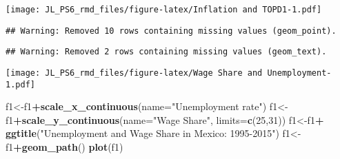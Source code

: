 \documentclass[
]{article}
\newenvironment{Shaded}{\begin{snugshade}}{\end{snugshade}}
\newcommand{\DataTypeTok}[1]{\textcolor[rgb]{0.13,0.29,0.53}{#1}}
\newcommand{\DecValTok}[1]{\textcolor[rgb]{0.00,0.00,0.81}{#1}}
\newcommand{\FloatTok}[1]{\textcolor[rgb]{0.00,0.00,0.81}{#1}}
\newcommand{\KeywordTok}[1]{\textcolor[rgb]{0.13,0.29,0.53}{\textbf{#1}}}
\newcommand{\NormalTok}[1]{#1}
\newcommand{\OperatorTok}[1]{\textcolor[rgb]{0.81,0.36,0.00}{\textbf{#1}}}
\newcommand{\StringTok}[1]{\textcolor[rgb]{0.31,0.60,0.02}{#1}}
\begin{document}
\texttt{[image: JL\_PS6\_rmd\_files/figure-latex/Inflation and TOPD1-1.pdf]}

\begin{Shaded}
\end{Shaded}

\begin{verbatim}
## Warning: Removed 10 rows containing missing values (geom_point).
\end{verbatim}

\begin{verbatim}
## Warning: Removed 2 rows containing missing values (geom_text).
\end{verbatim}

\texttt{[image: JL\_PS6\_rmd\_files/figure-latex/Wage Share and Unemployment-1.pdf]}

\begin{Shaded}
\begin{Highlighting}[]
\NormalTok{f1<-f1}\OperatorTok{+}\KeywordTok{scale_x_continuous}\NormalTok{(}\DataTypeTok{name=}\StringTok{"Unemployment rate"}\NormalTok{)}
\NormalTok{f1<-f1}\OperatorTok{+}\KeywordTok{scale_y_continuous}\NormalTok{(}\DataTypeTok{name=}\StringTok{"Wage Share"}\NormalTok{, }\DataTypeTok{limits=}\KeywordTok{c}\NormalTok{(}\DecValTok{25}\NormalTok{,}\DecValTok{31}\NormalTok{))}
\NormalTok{f1<-f1}\OperatorTok{+}\StringTok{ }\KeywordTok{ggtitle}\NormalTok{(}\StringTok{"Unemployment and Wage Share in Mexico: 1995-2015"}\NormalTok{)}
\NormalTok{f1<-f1}\OperatorTok{+}\KeywordTok{geom_path}\NormalTok{()}
\KeywordTok{plot}\NormalTok{(f1)}
\end{Highlighting}
\end{Shaded}
\end{document}
